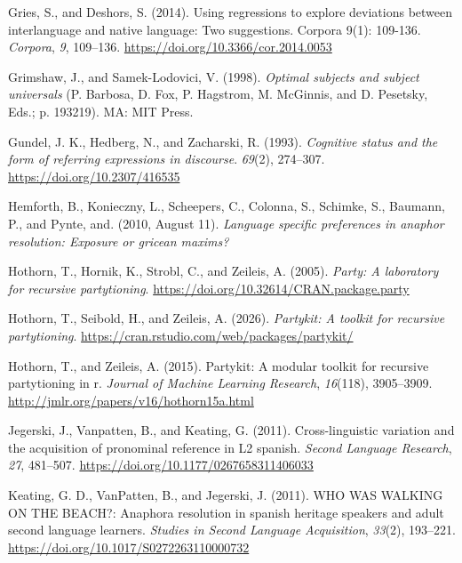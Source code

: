 \documentclass[
  letterpaper,
  DIV=11,
  numbers=noendperiod]{scrartcl}
\newlength{\cslhangindent}
\newenvironment{CSLReferences}[2] %
 {\begin{list}{}{%
  \setlength{\itemindent}{0pt}
  \setlength{\leftmargin}{0pt}
  \setlength{\parsep}{0pt}
  \ifodd #1
   \setlength{\leftmargin}{\cslhangindent}
   \setlength{\itemindent}{-1\cslhangindent}
  \fi
  \setlength{\itemsep}{#2\baselineskip}}}
 {\end{list}}
\begin{document}
\begin{CSLReferences}{1}{0}
Gries, S., and Deshors, S. (2014). Using regressions to explore
deviations between interlanguage and native language: Two suggestions.
Corpora 9(1): 109-136. \emph{Corpora}, \emph{9}, 109--136.
\url{https://doi.org/10.3366/cor.2014.0053}

Grimshaw, J., and Samek-Lodovici, V. (1998). \emph{Optimal subjects and
subject universals} (P. Barbosa, D. Fox, P. Hagstrom, M. McGinnis, and
D. Pesetsky, Eds.; p. 193219). MA: MIT Press.

Gundel, J. K., Hedberg, N., and Zacharski, R. (1993). \emph{Cognitive
status and the form of referring expressions in discourse}.
\emph{69}(2), 274--307. \url{https://doi.org/10.2307/416535}

{Hemforth, B., Konieczny, L., Scheepers, C., Colonna, S., Schimke, S.,
Baumann, P., and Pynte, and}. (2010, August 11). \emph{Language specific
preferences in anaphor resolution: Exposure or gricean maxims?}

Hothorn, T., Hornik, K., Strobl, C., and Zeileis, A. (2005).
\emph{Party: A laboratory for recursive partytioning}.
\url{https://doi.org/10.32614/CRAN.package.party}

Hothorn, T., Seibold, H., and Zeileis, A. (2026). \emph{Partykit: A
toolkit for recursive partytioning}.
\url{https://cran.rstudio.com/web/packages/partykit/}

Hothorn, T., and Zeileis, A. (2015). Partykit: A modular toolkit for
recursive partytioning in r. \emph{Journal of Machine Learning
Research}, \emph{16}(118), 3905--3909.
\url{http://jmlr.org/papers/v16/hothorn15a.html}

Jegerski, J., Vanpatten, B., and Keating, G. (2011). Cross-linguistic
variation and the acquisition of pronominal reference in L2 spanish.
\emph{Second Language Research}, \emph{27}, 481--507.
\url{https://doi.org/10.1177/0267658311406033}

Keating, G. D., VanPatten, B., and Jegerski, J. (2011). WHO WAS WALKING
ON THE BEACH?: Anaphora resolution in spanish heritage speakers and
adult second language learners. \emph{Studies in Second Language
Acquisition}, \emph{33}(2), 193--221.
\url{https://doi.org/10.1017/S0272263110000732}


\end{CSLReferences}
\end{document}
